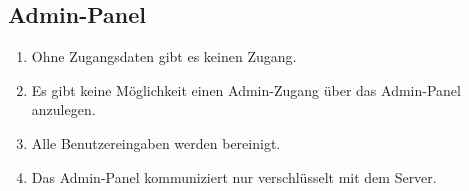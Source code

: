 \subsection{Admin-Panel}

\begin{enumerate}
    \item Ohne Zugangsdaten gibt es keinen Zugang.
    \item Es gibt keine Möglichkeit einen Admin-Zugang über das Admin-Panel anzulegen.
    \item Alle Benutzereingaben werden bereinigt.
    \item Das Admin-Panel kommuniziert nur verschlüsselt mit dem Server.
\end{enumerate}